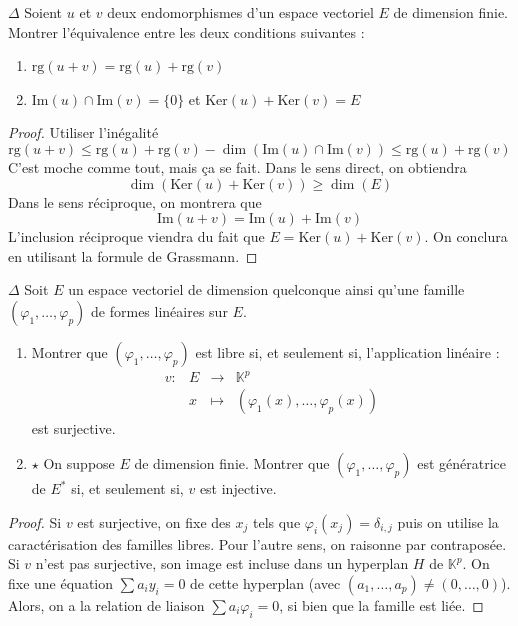 \documentclass[french,a4paper]{article}
\newcommand{\K}{\mathbb{K}}
\newcommand{\st}{^*}
\renewcommand{\ker}{\text{Ker}}
\newcommand{\im}{\text{Im}}
\theoremstyle{plain}
\theoremstyle{definition}
\theoremstyle{remark}
\begin{document}
\begin{ex}[Moulin.41]{$\Delta$}
	Soient $u$ et $v$ deux endomorphismes d'un espace vectoriel $E$ de dimension finie. Montrer l'équivalence entre les deux conditions suivantes :
	\begin{enumerate}
		\item $\text{rg}(u+v)=\text{rg}(u)+\text{rg}(v)$
		\item $\im(u)\cap\im(v)=\{0\}$ et $\ker(u)+\ker(v)=E$
	\end{enumerate}
\end{ex}
\begin{proof}
	Utiliser l'inégalité $$\text{rg}(u+v)\leqslant\text{rg}(u)+\text{rg}(v)-\dim\left(\im(u)\cap\im(v)\right)\leqslant\text{rg}(u)+\text{rg}(v)$$ C'est moche comme tout, mais ça se fait. Dans le sens direct, on obtiendra $$\dim(\ker(u)+\ker(v))\geqslant\dim(E)$$Dans le sens réciproque, on montrera que $$\im(u+v)=\im(u)+\im(v)$$ L'inclusion réciproque viendra du fait que $E=\ker(u)+\ker(v)$. On conclura en utilisant la formule de Grassmann. 
\end{proof}

\begin{ex}[Moulin.42]{$\Delta$} Soit $E$ un espace vectoriel de dimension quelconque ainsi qu'une famille $(\varphi_1,\ldots,\varphi_p)$ de formes linéaires sur $E$.
	\begin{enumerate}
		\item Montrer que $(\varphi_1,\ldots,\varphi_p)$ est libre si, et seulement si, l'application linéaire : $$\begin{array}{lrcl}
			v:&E&\longrightarrow&\K^p \\
			&x&\longmapsto&(\varphi_1(x),\ldots,\varphi_p(x))
		\end{array}$$ est surjective.
		\item $\star$ On suppose $E$ de dimension finie. Montrer que $(\varphi_1,\ldots,\varphi_p)$ est génératrice de $E\st$ si, et seulement si, $v$ est injective.
	\end{enumerate}
\end{ex}\begin{proof}
	Si $v$ est surjective, on fixe des $x_j$ tels que $\varphi_i(x_j)=\delta_{i,j}$ puis on utilise la caractérisation des familles libres. Pour l'autre sens, on raisonne par contraposée. Si $v$ n'est pas surjective, son image est incluse dans un hyperplan $H$ de $\K^p$.  On fixe une équation $\sum a_iy_i=0$ de cette hyperplan (avec $(a_1,\ldots,a_p)\ne(0,\ldots,0)$). Alors, on a la relation de liaison $\sum a_i\varphi_i=0$, si bien que la famille est liée.
\end{proof}
\end{document}
